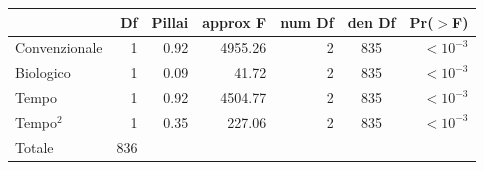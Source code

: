 \documentclass[10pt]{beamer}
\begin{document}
\begin{frame}[label=Anova]
  \hyperlink{Composizionale}{}
  \footnotesize
  \begin{table}
    \centering
    \begin{tabular}{lrrrrcr}
      \hline
      & Df & Pillai & approx F & num Df & den Df & Pr($>$F) \\ 
      \hline
      Convenzionale & 1 & 0.92 & 4955.26 & 2 & 835 & $<10^{-3}$ \\ 
      Biologico  & 1 & 0.09 & 41.72 & 2 & 835 &  $<10^{-3}$ \\ 
      Tempo & 1 & 0.92 & 4504.77 & 2 & 835 &  $<10^{-3}$  \\ 
      Tempo$^2$& 1 & 0.35 & 227.06 & 2 & 835 &  $<10^{-3}$ \\ 
      Totale & 836 &  &  &  &  &  \\ 
      \hline
    \end{tabular}
  \end{table}
\end{frame}
\end{document}
